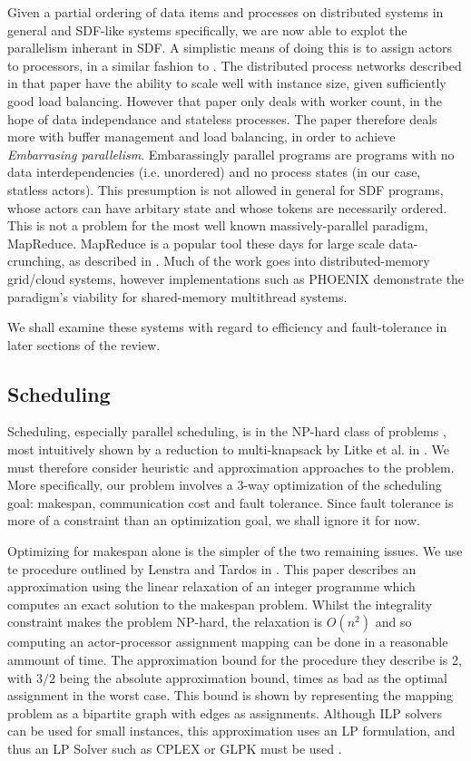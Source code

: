 Given a partial ordering of data items and processes on distributed systems in general and SDF-like systems specifically, we are now able to explot the parallelism inherant in SDF.
A simplistic means of doing this is to assign actors to processors, in a similar fashion to \cite{par03}.
The distributed process networks described in that paper have the ability to scale well with instance size, given sufficiently good load balancing.
However that paper only deals with worker count, in the hope of data independance and stateless processes.
The paper therefore deals more with buffer management and load balancing, in order to achieve {\em Embarrasing parallelism}.
Embarassingly parallel programs are programs with no data interdependencies (i.e. unordered) and no process states (in our case, statless actors).
This presumption is not allowed in general for SDF programs, whose actors can have arbitary state and whose tokens are necessarily ordered.
This is not a problem for the most well known massively-parallel paradigm, MapReduce.
MapReduce is a popular tool these days for large scale data-crunching, as described in \cite{dea08}.
Much of the work goes into distributed-memory grid/cloud systems, however implementations such as PHOENIX \cite{ran07} demonstrate the paradigm's viability for shared-memory multithread systems.

We shall examine these systems with regard to efficiency and fault-tolerance  in later sections of the review.

\subsection*{Scheduling}

Scheduling, especially parallel scheduling, is in the NP-hard class of problems \cite{len87, kha94}, most intuitively shown by a reduction to multi-knapsack by Litke et al. in \cite{lit07}.
We must therefore consider heuristic and approximation approaches to the problem.
More specifically, our problem involves a 3-way optimization of the scheduling goal: makespan, communication cost and fault tolerance.
Since fault tolerance is more of a constraint than an optimization goal, we shall ignore it for now.

Optimizing for makespan alone is the simpler of the two remaining issues.
We use te procedure outlined by Lenstra and Tardos in \cite{len87}.
This paper describes an approximation using the linear relaxation of an integer programme which computes an exact solution to the makespan problem.
Whilst the integrality constraint makes the problem NP-hard, the relaxation is $O(n^2)$ and so computing an actor-processor assignment mapping can be done in a reasonable ammount of time.
The approximation bound for the procedure they describe is 2, with $3/2$ being the absolute approximation bound, times as bad as the optimal assignment in the worst case.
This bound is shown by representing the mapping problem as a bipartite graph with edges as assignments.
Although ILP solvers can be used for small instances, this approximation uses an LP formulation, and thus an LP Solver such as CPLEX\cite{hen99} or GLPK\cite{glpk} must be used .

